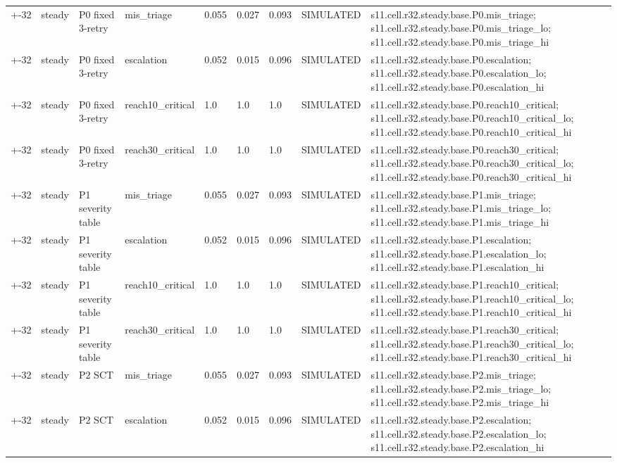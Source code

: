\begin{table}[t]
\begin{tabular}{lllllllll}
+-32 & steady & P0 fixed 3-retry & mis\_triage & 0.055 & 0.027 & 0.093 & SIMULATED & s11.cell.r32.steady.base.P0.mis\_triage; s11.cell.r32.steady.base.P0.mis\_triage\_lo; s11.cell.r32.steady.base.P0.mis\_triage\_hi \\
+-32 & steady & P0 fixed 3-retry & escalation & 0.052 & 0.015 & 0.096 & SIMULATED & s11.cell.r32.steady.base.P0.escalation; s11.cell.r32.steady.base.P0.escalation\_lo; s11.cell.r32.steady.base.P0.escalation\_hi \\
+-32 & steady & P0 fixed 3-retry & reach10\_critical & 1.0 & 1.0 & 1.0 & SIMULATED & s11.cell.r32.steady.base.P0.reach10\_critical; s11.cell.r32.steady.base.P0.reach10\_critical\_lo; s11.cell.r32.steady.base.P0.reach10\_critical\_hi \\
+-32 & steady & P0 fixed 3-retry & reach30\_critical & 1.0 & 1.0 & 1.0 & SIMULATED & s11.cell.r32.steady.base.P0.reach30\_critical; s11.cell.r32.steady.base.P0.reach30\_critical\_lo; s11.cell.r32.steady.base.P0.reach30\_critical\_hi \\
+-32 & steady & P1 severity table & mis\_triage & 0.055 & 0.027 & 0.093 & SIMULATED & s11.cell.r32.steady.base.P1.mis\_triage; s11.cell.r32.steady.base.P1.mis\_triage\_lo; s11.cell.r32.steady.base.P1.mis\_triage\_hi \\
+-32 & steady & P1 severity table & escalation & 0.052 & 0.015 & 0.096 & SIMULATED & s11.cell.r32.steady.base.P1.escalation; s11.cell.r32.steady.base.P1.escalation\_lo; s11.cell.r32.steady.base.P1.escalation\_hi \\
+-32 & steady & P1 severity table & reach10\_critical & 1.0 & 1.0 & 1.0 & SIMULATED & s11.cell.r32.steady.base.P1.reach10\_critical; s11.cell.r32.steady.base.P1.reach10\_critical\_lo; s11.cell.r32.steady.base.P1.reach10\_critical\_hi \\
+-32 & steady & P1 severity table & reach30\_critical & 1.0 & 1.0 & 1.0 & SIMULATED & s11.cell.r32.steady.base.P1.reach30\_critical; s11.cell.r32.steady.base.P1.reach30\_critical\_lo; s11.cell.r32.steady.base.P1.reach30\_critical\_hi \\
+-32 & steady & P2 SCT & mis\_triage & 0.055 & 0.027 & 0.093 & SIMULATED & s11.cell.r32.steady.base.P2.mis\_triage; s11.cell.r32.steady.base.P2.mis\_triage\_lo; s11.cell.r32.steady.base.P2.mis\_triage\_hi \\
+-32 & steady & P2 SCT & escalation & 0.052 & 0.015 & 0.096 & SIMULATED & s11.cell.r32.steady.base.P2.escalation; s11.cell.r32.steady.base.P2.escalation\_lo; s11.cell.r32.steady.base.P2.escalation\_hi \\

\end{tabular}
\end{table}
